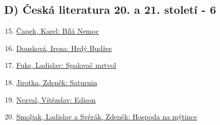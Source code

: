 \documentclass[a4paper,11pt]{article}
\begin{document}
\subsection*{D)	Česká literatura 20. a 21. století - 6}
\begin{enumerate}
    \setcounter{enumi}{14}
    \item \hyperref[sec:bilanemoc]{Čapek, Karel: Bílá Nemoc}
    \item \hyperref[sec:hrdybudzes]{Dousková, Irena: Hrdý Budžes}
    \item \hyperref[sec:spalovacmrtvol]{Fuks, Ladislav: Spalovač mrtvol}
    \item \hyperref[sec:saturnin]{Jirotka, Zdeněk: Saturnin}
    \item \hyperref[sec:edison]{Nezval, Vítězslav: Edison}
    \item \hyperref[sec:hospodanamytince]{Smoljak, Ladislav a Svěrák, Zdeněk: Hospoda na mýtince}
\end{enumerate}














\end{document}
